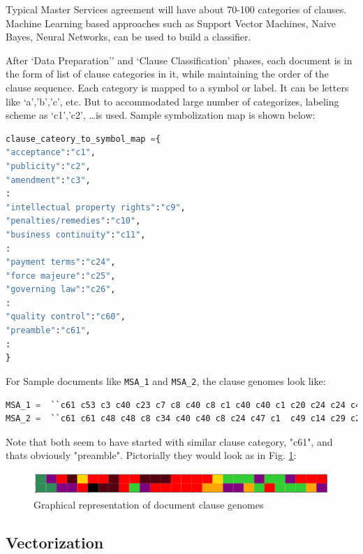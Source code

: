 \documentclass[9pt,academicons]{article}
\begin{document}
Typical Master Services agreement will have about 70-100 categories of clauses. Machine Learning based approaches such as Support Vector Machines, Naive Bayes, Neural Networks, can be used to build a classifier. 

After `Data Preparation'' and `Clause Classification' phases, each document is in the form of list of clause categories in it, while maintaining the order of the clause sequence. Each category is mapped to a symbol or label. It can be letters like `a','b','c', etc. But to accommodated large number of categorizes, labeling scheme as `c1','c2', \ldots is used. Sample symbolization map is shown below:

\begin{lstlisting}[language=Python, basicstyle=\footnotesize ]
clause_cateory_to_symbol_map ={ 
"acceptance":"c1", 
"publicity":"c2", 
"amendment":"c3", 
:
"intellectual property rights":"c9", 
"penalties/remedies":"c10", 
"business continuity":"c11", 
:
"payment terms":"c24", 
"force majeure":"c25", 
"governing law":"c26", 
:
"quality control":"c60", 
"preamble":"c61", 
:
}
\end{lstlisting}

For Sample documents like \lstinline|MSA_1| and \lstinline|MSA_2|, the clause genomes look like:
\begin{lstlisting}[language=Python, basicstyle=\footnotesize ]
MSA_1 =  ``c61 c53 c3 c40 c23 c7 c8 c40 c8 c1 c40 c40 c1 c20 c24 c24 c47 c24 c24 c50 c7 c7 c7''
MSA_2 =  ``c61 c61 c48 c48 c8 c34 c40 c40 c8 c24 c47 c1  c49 c14 c29 c2 c30 c24 c30 c9 c53''
\end{lstlisting}

Note that both seem to have started with similar clause category, "c61", and thats obviously "preamble". Pictorially they would look as in Fig. \ref{fig:docclausegenome}:

 \begin{figure}[h!]
 \begin{center}
  \includegraphics[width=\textwidth,keepaspectratio]{img/two_genomes.png}
  \caption{Graphical representation of document clause genomes}
  \label{fig:docclausegenome}
 \end{center}
 \end{figure}


\subsection{Vectorization}
\label{subsec:vecrtorization}
\end{document}

